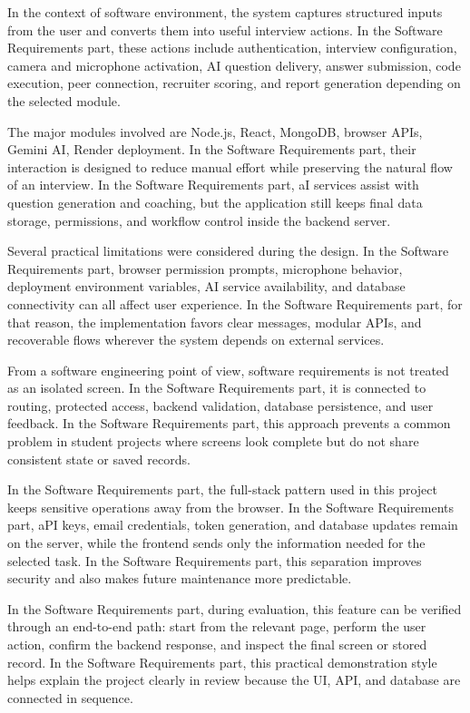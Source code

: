 \documentclass[12pt,a4paper]{report}
\begin{document}
In the context of software environment, the system captures structured inputs from the user and converts them into useful interview actions. In the Software Requirements part, these actions include authentication, interview configuration, camera and microphone activation, AI question delivery, answer submission, code execution, peer connection, recruiter scoring, and report generation depending on the selected module.


The major modules involved are Node.js, React, MongoDB, browser APIs, Gemini AI, Render deployment. In the Software Requirements part, their interaction is designed to reduce manual effort while preserving the natural flow of an interview. In the Software Requirements part, aI services assist with question generation and coaching, but the application still keeps final data storage, permissions, and workflow control inside the backend server.


Several practical limitations were considered during the design. In the Software Requirements part, browser permission prompts, microphone behavior, deployment environment variables, AI service availability, and database connectivity can all affect user experience. In the Software Requirements part, for that reason, the implementation favors clear messages, modular APIs, and recoverable flows wherever the system depends on external services.


From a software engineering point of view, software requirements is not treated as an isolated screen. In the Software Requirements part, it is connected to routing, protected access, backend validation, database persistence, and user feedback. In the Software Requirements part, this approach prevents a common problem in student projects where screens look complete but do not share consistent state or saved records.


In the Software Requirements part, the full-stack pattern used in this project keeps sensitive operations away from the browser. In the Software Requirements part, aPI keys, email credentials, token generation, and database updates remain on the server, while the frontend sends only the information needed for the selected task. In the Software Requirements part, this separation improves security and also makes future maintenance more predictable.


In the Software Requirements part, during evaluation, this feature can be verified through an end-to-end path: start from the relevant page, perform the user action, confirm the backend response, and inspect the final screen or stored record. In the Software Requirements part, this practical demonstration style helps explain the project clearly in review because the UI, API, and database are connected in sequence.
\end{document}
